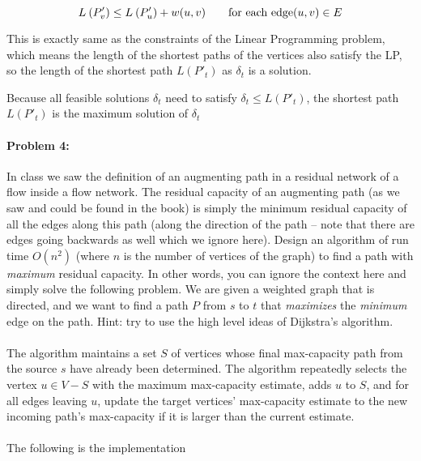 \documentclass{article}
\begin{document}
$$L\:(P'_{v}) \le L\:(P'_{u}) + w(u, v) \qquad \text{for each edge} (u, v) \in E$$

This is exactly same as the constraints of the Linear Programming problem, which means the length of the shortest paths of the vertices also satisfy the LP, so the length of the shortest path $L(P'_t)$ as $\delta_t$ is a solution.

Because all feasible solutions $\delta_t$ need to satisfy $\delta_t \le L(P'_{t})$, the shortest path $L(P'_{t})$ is the maximum solution of $\delta_t$



\newpage
\paragraph{Problem 4:}
In class we saw the definition of an augmenting path in a residual network of a flow inside a flow network. The residual capacity of an augmenting path (as we saw and could be found in the book) is simply the minimum residual capacity of all the edges along this path (along the direction of the path -- note that there are edges going backwards as well which we ignore here). Design an algorithm of run time $O(n^2)$ (where $n$ is the number of vertices of the graph) to find a path with \emph{maximum} residual capacity. In other words, you can ignore the context here and simply solve the following problem. We are given a weighted graph that is directed, and we want to find a path $P$ from $s$ to $t$ that \emph{maximizes} the \emph{minimum} edge on the path. Hint: try to use the high level ideas of Dijkstra's algorithm.

\vspace{20px}

\paragraph{}

The algorithm maintains a set $S$ of vertices whose final max-capacity path from the source $s$ have already been determined. The algorithm repeatedly selects the vertex $u \in V-S$ with the maximum max-capacity estimate, adds $u$ to $S$, and for all edges leaving $u$, update the target vertices' max-capacity estimate to the new incoming path's max-capacity if it is larger than the current estimate.


\paragraph{}
The following is the implementation
\end{document}

